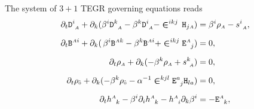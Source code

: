 \documentclass[
10pt, %
a4paper, %
oneside, %
twocolumn,
headinclude,footinclude, %
BCOR5mm, %
]{scrartcl}
\newcommand{\sA}{\mathsmaller A}
\newcommand{\sB}{\mathsmaller B}
\newcommand{\sC}{\mathsmaller C}
\newcommand{\sD}{\mathsmaller D}
\newcommand{\pd}[1]{\partial_{#1}}
\newcommand{\mg}[1]{\kappa_{#1}}			%
\newcommand{\tetrsymbol}{h}
\newcommand{\tetr}[2]{\tetrsymbol^{#1}_{\phantom{#1}#2}}
\newcommand{\stress}[2]{s_{\ #1}^{#2}}
\newcommand{\detTetr}{\tetrsymbol}
\newcommand{\aD}[2]{\mathcal{D}_{\phantom{#2}#1}^{#2}}	%
\newcommand{\Dfin}[2]{\mathtt{D}_{\phantom{#2}#1}^{#2}}	%
\newcommand{\Hfin}[2]{\mathtt{H}_{#2#1}}	%
\newcommand{\Efin}[2]{\mathtt{E}^{#1}_{\phantom{#1}#2}}	%
\newcommand{\Ufin}{\mathtt{U}}
\newcommand{\aB}[2]{\mathcal{B}^{#1#2}}	%
\newcommand{\Bfin}[2]{\mathtt{B}^{#1#2}}	%
\newcommand{\aU}{\mathcal{U}}%
\newcommand{\LCsymb}{\bm{\in}}    %
\newcommand{\rhs}[1]{f_{#1}}
\newcommand{\KD}[2]{\delta^{#1}_{\ #2}}
\newcommand{\indalg}[1]{\hat{\mathsmaller{#1}}}
\newcommand{\shift}[1]{\beta^{#1}}
\begin{document}
	The system of $ 3+1 $ TEGR governing equations reads
	\begin{subequations}\label{eqn.3+1.summary}
		\begin{align}%
			\pd{t} \Dfin{\sA}{i} + \pd{k}(\shift{i} 
			\Dfin{\sA}{k} - \shift{k}\Dfin{\sA}{i}  - \LCsymb^{ikj} \,
			\Hfin{\sA}{j}) & 
			= \shift{i} \rho_{\sA} - \stress{\sA}{i},
			\label{eqn.3+1.D}
			\\[2mm]
			\pd{t} \Bfin{\sA}{i} + \pd{k}(\,\shift{i} 
			\Bfin{\sA}{k} - \shift{k}\Bfin{\sA}{i}  + \LCsymb^{ikj} 
			\Efin{\sA}{j}) & 
			= 0,
			\label{eqn.3+1.B}
			\\[2mm]
			\pd{t} \rho_\sA +  \pd{k} (-\shift{k} \rho_\sA + \stress{\sA}{k}) &= 
			0,\label{eqn.3+1.m}\\[2mm]
			\pd{t} \rho_{\indalg{0}} + \pd{k} (-\shift{k} \rho_{\indalg{0}} 
			- \alpha^{-1} 
			\LCsymb^{kjl}\Efin{a}{j}\Hfin{a}{l}) &= 0,\label{eqn.3+1.e}\\[2mm]
			\pd{t} \tetr{\sA}{k} - \beta^i \pd{i} \tetr{\sA}{k} - \tetr{\sA}{i} \pd{k} \beta^i 
			& = 
			-\Efin{\sA}{k},
			\label{eqn.3+1.h}
		\end{align}
	\end{subequations}
\end{document}
